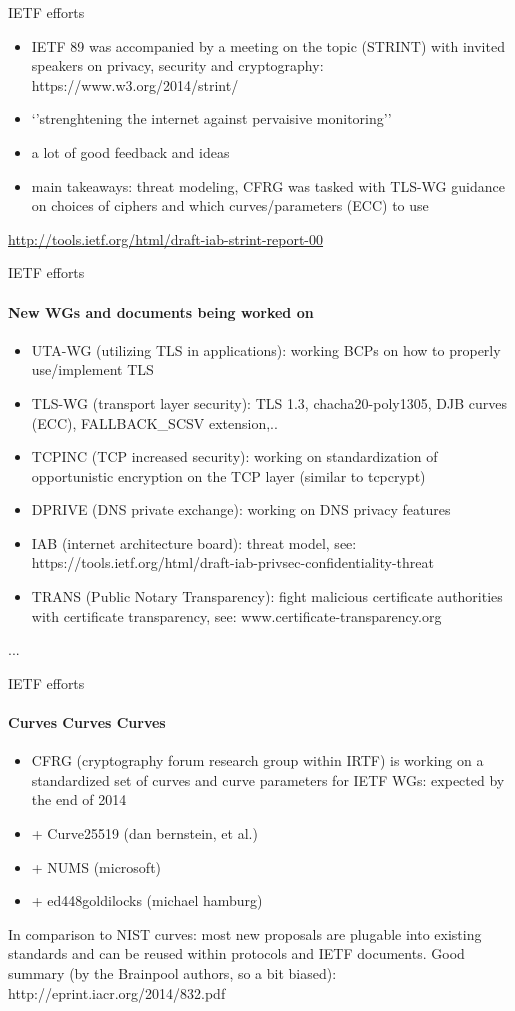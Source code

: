 \documentclass[hyperref={draft}]{beamer}
\begin{document}
\begin{frame}{IETF efforts}
  \begin{itemize}
    \item IETF 89 was accompanied by a meeting on the topic (STRINT) with invited speakers on privacy, security and cryptography: https://www.w3.org/2014/strint/
    \item `'strenghtening the internet against pervaisive monitoring''
    \item a lot of good feedback and ideas
    \item main takeaways: threat modeling, CFRG was tasked with TLS-WG guidance on choices of ciphers and which curves/parameters (ECC) to use
  \end{itemize}
\tiny
\url{http://tools.ietf.org/html/draft-iab-strint-report-00}
\end{frame}


\begin{frame}{IETF efforts}
  \framesubtitle{New WGs and documents being worked on }
  \begin{itemize}
    \item UTA-WG (utilizing TLS in applications): working BCPs on how to properly use/implement TLS
    \item TLS-WG (transport layer security): TLS 1.3, chacha20-poly1305, DJB curves (ECC), FALLBACK\_SCSV extension,..
    \item TCPINC (TCP increased security): working on standardization of opportunistic encryption on the TCP layer (similar to tcpcrypt)
    \item DPRIVE (DNS private exchange): working on DNS privacy features
    \item IAB (internet architecture board): threat model, see: https://tools.ietf.org/html/draft-iab-privsec-confidentiality-threat
    \item TRANS (Public Notary Transparency): fight malicious certificate authorities with certificate transparency, see: www.certificate-transparency.org
  \end{itemize}
...
\end{frame}

\begin{frame}{IETF efforts}
  \framesubtitle{Curves Curves Curves}
  \begin{itemize}
    \item CFRG (cryptography forum research group within IRTF) is working on a standardized set of curves and curve parameters for IETF WGs: expected by the end of 2014
    \item + Curve25519 (dan bernstein, et al.)
    \item + NUMS (microsoft)
    \item + ed448goldilocks (michael hamburg)
  \end{itemize}
In comparison to NIST curves: most new proposals are plugable into existing standards and can be reused within protocols and IETF documents.
\newline
\newline
Good summary (by the Brainpool authors, so a bit biased): http://eprint.iacr.org/2014/832.pdf
\end{frame}
\end{document}
